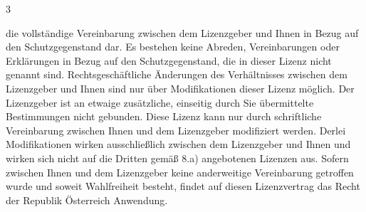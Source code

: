 \begin{WidePar}
\begin{multicols}{3}
\begin{description}
  die vollständige Vereinbarung zwischen dem Lizenzgeber
  und Ihnen in Bezug auf den Schutzgegenstand dar. Es
  bestehen keine Abreden, Vereinbarungen oder Erklärungen
  in Bezug auf den Schutzgegenstand, die in dieser Lizenz
  nicht genannt sind. Rechtsgeschäftliche Änderungen des
  Verhältnisses zwischen dem Lizenzgeber und Ihnen sind
  nur über Modifikationen dieser Lizenz möglich. Der
  Lizenzgeber ist an etwaige zusätzliche, einseitig durch
  Sie übermittelte Bestimmungen nicht gebunden. Diese
  Lizenz kann nur durch schriftliche Vereinbarung zwischen
  Ihnen und dem Lizenzgeber modifiziert werden. Derlei
  Modifikationen wirken ausschließlich zwischen dem
  Lizenzgeber und Ihnen und wirken sich nicht auf die
  Dritten gemäß 8.a) angebotenen Lizenzen aus.
  Sofern zwischen Ihnen und dem Lizenzgeber keine
  anderweitige Vereinbarung getroffen wurde und soweit
  Wahlfreiheit besteht, findet auf diesen Lizenzvertrag
  das Recht der Republik Österreich Anwendung.
  
  

\end{description}
\end{multicols}
\end{WidePar}
